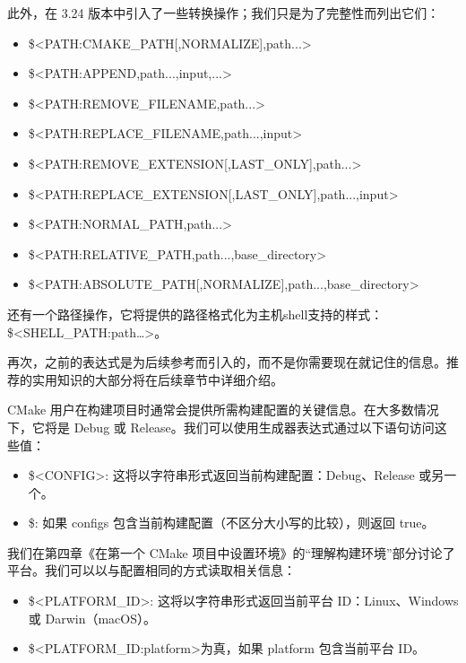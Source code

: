 此外，在 3.24 版本中引入了一些转换操作；我们只是为了完整性而列出它们：

\begin{itemize}
\item
\$<PATH:CMAKE\_PATH[,NORMALIZE],path...>

\item
\$<PATH:APPEND,path...,input,...>

\item
\$<PATH:REMOVE\_FILENAME,path...>

\item
\$<PATH:REPLACE\_FILENAME,path...,input>

\item
\$<PATH:REMOVE\_EXTENSION[,LAST\_ONLY],path...>

\item
\$<PATH:REPLACE\_EXTENSION[,LAST\_ONLY],path...,input>

\item
\$<PATH:NORMAL\_PATH,path...>

\item
\$<PATH:RELATIVE\_PATH,path...,base\_directory>

\item
\$<PATH:ABSOLUTE\_PATH[,NORMALIZE],path...,base\_directory>
\end{itemize}

还有一个路径操作，它将提供的路径格式化为主机shell支持的样式：\$<SHELL\_PATH:path…>。

再次，之前的表达式是为后续参考而引入的，而不是你需要现在就记住的信息。推荐的实用知识的大部分将在后续章节中详细介绍。



CMake 用户在构建项目时通常会提供所需构建配置的关键信息。在大多数情况下，它将是 Debug 或 Release。我们可以使用生成器表达式通过以下语句访问这些值：

\begin{itemize}
\item
\$<CONFIG>: 这将以字符串形式返回当前构建配置：Debug、Release 或另一个。

\item
\$<CONFIG:configs>: 如果 configs 包含当前构建配置（不区分大小写的比较），则返回 true。
\end{itemize}

我们在第四章《在第一个 CMake 项目中设置环境》的“理解构建环境”部分讨论了平台。我们可以以与配置相同的方式读取相关信息：

\begin{itemize}
\item
\$<PLATFORM\_ID>: 这将以字符串形式返回当前平台 ID：Linux、Windows 或 Darwin（macOS）。

\item
\$<PLATFORM\_ID:platform>为真，如果 platform 包含当前平台 ID。
\end{itemize}

